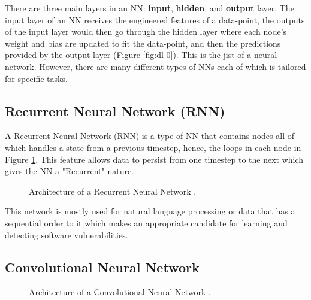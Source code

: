 \documentclass[12pt,twocolumn,letterpaper]{article}
\begin{document}
There are three main layers in an NN: \textbf{input}, \textbf{hidden}, and \textbf{output} layer. 
The input layer of an NN receives the engineered features of a data-point, the outputs of the input layer would
then go through the hidden layer where each node's weight and bias are updated to fit the data-point, and 
then the predictions provided by the output layer (Figure \ref{fig:dl-0}). This is the jist of a 
neural network. However, there are many different types of NNs each of which is tailored for specific 
tasks.

\subsection{Recurrent Neural Network (RNN)}
\label{sub:recurrent-neural-network}

A Recurrent Neural Network (RNN) is a type of NN that contains nodes all of which handles a state from a 
previous timestep, hence, the loops in each node in Figure \ref{fig:dl-1}. This feature allows data to 
persist from one timestep to the next which gives the NN a "Recurrent" nature.

\begin{figure}[h]
    \centering

    \caption{Architecture of a Recurrent Neural Network \cite{Lin20}.}
    \label{fig:dl-1}
\end{figure}

This network is mostly used for natural language processing or data that has a sequential order to it which 
makes an appropriate candidate for learning and detecting software vulnerabilities. 

\subsection{Convolutional Neural Network}
\label{sub:convolutional-neural-network}


\begin{figure}[h]
    \centering

    \caption{Architecture of a Convolutional Neural Network \cite{Lin20}.}
    \label{fig:dl-2}
\end{figure}
\end{document}

